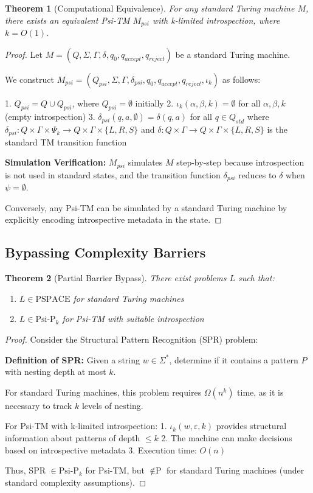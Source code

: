 \documentclass[11pt]{article}
\newtheorem{theorem}{Theorem}
\begin{document}
\begin{theorem}[Computational Equivalence]
For any standard Turing machine $M$, there exists an equivalent Psi-TM $M_{psi}$ with k-limited introspection, where $k = O(1)$.
\end{theorem}

\begin{proof}
Let $M = (Q, \Sigma, \Gamma, \delta, q_0, q_{accept}, q_{reject})$ be a standard Turing machine.

We construct $M_{psi} = (Q_{psi}, \Sigma, \Gamma, \delta_{psi}, q_0, q_{accept}, q_{reject}, \iota_k)$ as follows:

1. $Q_{psi} = Q \cup Q_{psi}$, where $Q_{psi} = \emptyset$ initially
2. $\iota_k(\alpha, \beta, k) = \emptyset$ for all $\alpha, \beta, k$ (empty introspection)
3. $\delta_{psi}(q, a, \emptyset) = \delta(q, a)$ for all $q \in Q_{std}$ where $\delta_{psi}: Q \times \Gamma \times \Psi_k \to Q \times \Gamma \times \{L, R, S\}$ and $\delta: Q \times \Gamma \to Q \times \Gamma \times \{L, R, S\}$ is the standard TM transition function

\textbf{Simulation Verification:} $M_{psi}$ simulates $M$ step-by-step because introspection is not used in standard states, and the transition function $\delta_{psi}$ reduces to $\delta$ when $\psi = \emptyset$.

Conversely, any Psi-TM can be simulated by a standard Turing machine by explicitly encoding introspective metadata in the state.
\end{proof}

\subsection{Bypassing Complexity Barriers}

\begin{theorem}[Partial Barrier Bypass]
There exist problems $L$ such that:
\begin{enumerate}
\item $L \in \text{PSPACE}$ for standard Turing machines
\item $L \in \text{Psi-P}_k$ for Psi-TM with suitable introspection
\end{enumerate}
\end{theorem}

\begin{proof}
Consider the Structural Pattern Recognition (SPR) problem:

\textbf{Definition of SPR:} Given a string $w \in \Sigma^*$, determine if it contains a pattern $P$ with nesting depth at most $k$.

For standard Turing machines, this problem requires $\Omega(n^k)$ time, as it is necessary to track $k$ levels of nesting.

For Psi-TM with k-limited introspection:
1. $\iota_k(w, \varepsilon, k)$ provides structural information about patterns of depth $\leq k$
2. The machine can make decisions based on introspective metadata
3. Execution time: $O(n)$

Thus, SPR $\in \text{Psi-P}_k$ for Psi-TM, but $\notin \text{P}$ for standard Turing machines (under standard complexity assumptions).
\end{proof}
\end{document}
